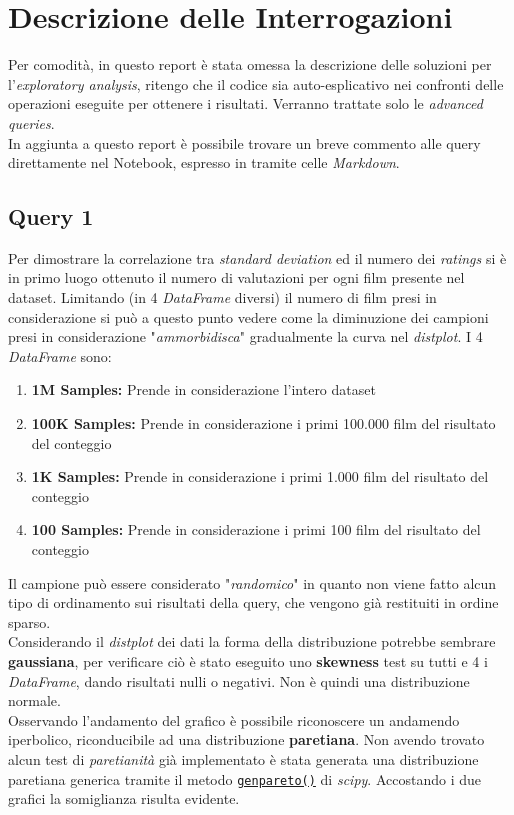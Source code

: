 \documentclass{article}
\begin{document}
    \newpage
    \section{Descrizione delle Interrogazioni}
    Per comodità, in questo report è stata omessa la descrizione delle soluzioni per l'\textit{exploratory analysis}, ritengo che il codice sia auto-esplicativo nei confronti delle operazioni eseguite per ottenere i risultati. Verranno trattate solo le \textit{advanced queries}.\\
    In aggiunta a questo report è possibile trovare un breve commento alle query direttamente nel Notebook, espresso in tramite celle \textit{Markdown}.
    \subsection{Query 1}
        Per dimostrare la correlazione tra \textit{standard deviation} ed il numero dei \textit{ratings} si è in primo luogo ottenuto il numero di valutazioni per ogni film presente nel dataset. Limitando (in 4 \textit{DataFrame} diversi) il numero di film presi in considerazione si può a questo punto vedere come la diminuzione dei campioni presi in considerazione "\textit{ammorbidisca}" gradualmente la curva nel \textit{distplot}. I 4 \textit{DataFrame} sono:
        \begin{enumerate}
            \item \textbf{1M Samples:} Prende in considerazione l'intero dataset
            \item \textbf{100K Samples:} Prende in considerazione i primi 100.000 film del risultato del conteggio
            \item \textbf{1K Samples:} Prende in considerazione i primi 1.000 film del risultato del conteggio
            \item \textbf{100 Samples:} Prende in considerazione i primi 100 film del risultato del conteggio
        \end{enumerate}
        Il campione può essere considerato "\textit{randomico}" in quanto non viene fatto alcun tipo di ordinamento sui risultati della query, che vengono già restituiti in ordine sparso.\\
        Considerando il \textit{distplot} dei dati la forma della distribuzione potrebbe sembrare \textbf{gaussiana}, per verificare ciò è stato eseguito uno \textbf{skewness} test su tutti e 4 i \textit{DataFrame}, dando risultati nulli o negativi. Non è quindi una distribuzione normale.\\
        Osservando l'andamento del grafico è possibile riconoscere un andamendo iperbolico, riconducibile ad una distribuzione \textbf{paretiana}. Non avendo trovato alcun test di \textit{paretianità} già implementato è stata generata una distribuzione paretiana generica tramite il metodo \href{https://docs.scipy.org/doc/scipy/reference/generated/scipy.stats.genpareto.html}{\texttt{genpareto()}} di \textit{scipy}. Accostando i due grafici la somiglianza risulta evidente.
\end{document}

